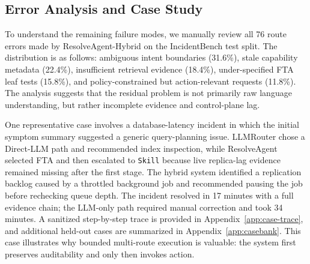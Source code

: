 \documentclass[conference]{IEEEtran}
\begin{document}
\begin{table}[t]
\centering
\caption{Governance and safety evaluation. Lower is better except as noted.}
\label{tab:safety}
\end{table}

\subsection{Error Analysis and Case Study}
To understand the remaining failure modes, we manually review all 76 route errors made by ResolveAgent-Hybrid on the IncidentBench test split. The distribution is as follows: ambiguous intent boundaries (31.6\%), stale capability metadata (22.4\%), insufficient retrieval evidence (18.4\%), under-specified FTA leaf tests (15.8\%), and policy-constrained but action-relevant requests (11.8\%). The analysis suggests that the residual problem is not primarily raw language understanding, but rather incomplete evidence and control-plane lag.

One representative case involves a database-latency incident in which the initial symptom summary suggested a generic query-planning issue. LLMRouter chose a Direct-LLM path and recommended index inspection, while ResolveAgent selected FTA and then escalated to \texttt{Skill} because live replica-lag evidence remained missing after the first stage. The hybrid system identified a replication backlog caused by a throttled background job and recommended pausing the job before rechecking queue depth. The incident resolved in 17 minutes with a full evidence chain; the LLM-only path required manual correction and took 34 minutes. A sanitized step-by-step trace is provided in Appendix~\ref{app:case-trace}, and additional held-out cases are summarized in Appendix~\ref{app:casebank}. This case illustrates why bounded multi-route execution is valuable: the system first preserves auditability and only then invokes action.
\end{document}
